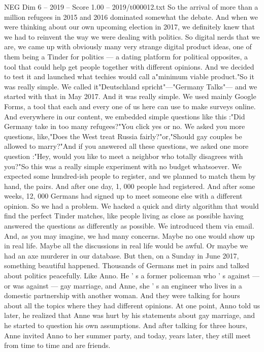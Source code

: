\begin{textsample}{NEG Dim 6 – 2019 – Score 1.00 – 2019/t000012.txt}
So the arrival of more than a million refugees in 2015 and 2016 dominated somewhat the debate.
And when we were thinking about our own upcoming election in 2017, we definitely knew that we had to reinvent the way we were dealing with politics.
So digital nerds that we are, we came up with obviously many very strange digital product ideas, one of them being a Tinder for politics — a dating platform for political opposites, a tool that could help get people together with different opinions.
And we decided to test it and launched what techies would call a"minimum viable product."So it was really simple.
We called it"Deutschland spricht"—"Germany Talks"— and we started with that in May 2017.
And it was really simple.
We used mainly Google Forms, a tool that each and every one of us here can use to make surveys online.
And everywhere in our content, we embedded simple questions like this :"Did Germany take in too many refugees?"You click yes or no.
We asked you more questions, like,"Does the West treat Russia fairly?"or,"Should gay couples be allowed to marry?"And if you answered all these questions, we asked one more question :"Hey, would you like to meet a neighbor who totally disagrees with you?"So this was a really simple experiment with no budget whatsoever.
We expected some hundred-ish people to register, and we planned to match them by hand, the pairs.
And after one day, 1, 000 people had registered.
And after some weeks, 12, 000 Germans had signed up to meet someone else with a different opinion.
So we had a problem.
We hacked a quick and dirty algorithm that would find the perfect Tinder matches, like people living as close as possible having answered the questions as differently as possible.
We introduced them via email.
And, as you may imagine, we had many concerns.
Maybe no one would show up in real life.
Maybe all the discussions in real life would be awful.
Or maybe we had an axe murderer in our database.
But then, on a Sunday in June 2017, something beautiful happened.
Thousands of Germans met in pairs and talked about politics peacefully.
Like Anno.
He ' s a former policeman who ' s against — or was against — gay marriage, and Anne, she ' s an engineer who lives in a domestic partnership with another woman.
And they were talking for hours about all the topics where they had different opinions.
At one point, Anno told us later, he realized that Anne was hurt by his statements about gay marriage, and he started to question his own assumptions.
And after talking for three hours, Anne invited Anno to her summer party, and today, years later, they still meet from time to time and are friends.

\end{textsample}
